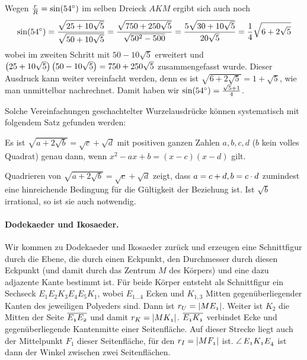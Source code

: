 \documentclass[11pt]{article}
\begin{document}
Wegen $\frac{r}{R}=\sin(54^{\circ})$ im selben Dreieck $AKM$ ergibt sich auch
noch 
\begin{gather*}
  \sin(54^{\circ})=\frac{\sqrt{25+10\sqrt{5}}}{\sqrt{50+10\sqrt{5}}}
  =\frac{\sqrt{750+250\sqrt{5}}}{\sqrt{50^2-500}}
  =\frac{5\sqrt{30+10\sqrt{5}}}{20\sqrt{5}}
  =\frac{1}{4}\sqrt{6+2\sqrt{5}}
\end{gather*}
wobei im zweiten Schritt mit $50-10\sqrt{5}$ erweitert und
$\left(25+10\sqrt{5}\right)\left(50-10\sqrt{5}\right)=750+250\sqrt{5}$ zusammengefasst wurde.
Dieser Ausdruck kann weiter vereinfacht werden, denn es ist
$\sqrt{6+2\sqrt{5}}=1+\sqrt{5}$, wie man unmittelbar nachrechnet.  Damit haben
wir $\sin(54^{\circ})=\frac{\sqrt{5}+1}{4}$.

Solche Vereinfachungen geschachtelter Wurzelausdrücke können systematisch mit
folgendem Satz gefunden werden:  

\begin{satz}
  Es ist $\sqrt{a+2\sqrt{b}}=\sqrt{c}+\sqrt{d}$ mit positiven ganzen Zahlen
  $a,b,c,d$ ($b$ kein volles Quadrat) genau dann, wenn $x^2-ax+b=(x-c)(x-d)$
  gilt.
\end{satz}

\begin{beweis}
  Quadrieren von $\sqrt{a+2\sqrt{b}}=\sqrt{c}+\sqrt{d}$ zeigt, dass $a=c+d,
  b=c\cdot d$ zumindest eine hinreichende Bedingung für die Gültigkeit der
  Beziehung ist.  Ist $\sqrt{b}$ irrational, so ist sie auch notwendig.
\end{beweis}

\paragraph{Dodekaeder und Ikosaeder.}
Wir kommen zu Dodekaeder und Ikosaeder zurück und erzeugen eine Schnittfigur
durch die Ebene, die durch einen Eckpunkt, den Durchmesser durch diesen
Eckpunkt (und damit durch das Zentrum $M$ des Körpers) und eine dazu adjazente
Kante bestimmt ist.  Für beide Körper entsteht als Schnittfigur ein Sechseck
$E_1E_2K_3E_4E_5K_1$, wobei $E_{1\dots4}$ Ecken und $K_{1,3}$ Mitten
gegenüberliegender Kanten des jeweiligen Polyeders sind.  Dann ist
$r_U=\left\vert {\mathnormal{ME_1}}\right\vert$.  Weiter ist $K_2$ die Mitten der Seite
$\overline{{\mathnormal{E_1E_2}}}$ und damit $r_K=\left\vert {\mathnormal{MK_1}}\right\vert$.  $\overline{{\mathnormal{E_1K_1}}}$
verbindet Ecke und gegenüberliegende Kantenmitte einer Seitenfläche. Auf
dieser Strecke liegt auch der Mittelpunkt $F_1$ dieser Seitenfläche, für den
$r_I=\left\vert {\mathnormal{MF_1}}\right\vert$ ist. $\kangle{E_1K_1E_4}$ ist dann der Winkel zwischen
zwei Seitenflächen. 
\end{document}
